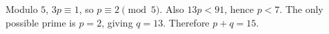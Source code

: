 Modulo $5$, $3p\equiv1$, so $p\equiv2\pmod5$. Also $13p<91$, hence $p<7$. The only possible prime is $p=2$, giving $q=13$. Therefore $p+q=\boxed{15}$.
